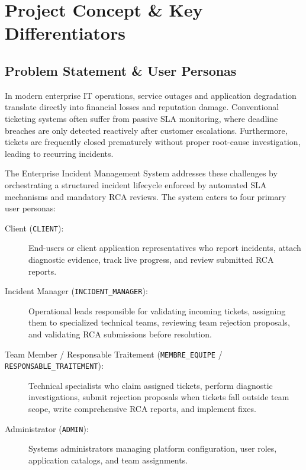 \documentclass[12pt,a4paper]{report}
\begin{document}
\chapter{Project Concept \& Key Differentiators}

\section{Problem Statement \& User Personas}
In modern enterprise IT operations, service outages and application degradation translate directly into financial losses and reputation damage. Conventional ticketing systems often suffer from passive SLA monitoring, where deadline breaches are only detected reactively after customer escalations. Furthermore, tickets are frequently closed prematurely without proper root-cause investigation, leading to recurring incidents.

The Enterprise Incident Management System addresses these challenges by orchestrating a structured incident lifecycle enforced by automated SLA mechanisms and mandatory RCA reviews. The system caters to four primary user personas:
\begin{description}
    \item[Client (\texttt{CLIENT}):] End-users or client application representatives who report incidents, attach diagnostic evidence, track live progress, and review submitted RCA reports.
    \item[Incident Manager (\texttt{INCIDENT\_MANAGER}):] Operational leads responsible for validating incoming tickets, assigning them to specialized technical teams, reviewing team rejection proposals, and validating RCA submissions before resolution.
    \item[Team Member / Responsable Traitement (\texttt{MEMBRE\_EQUIPE} / \texttt{RESPONSABLE\_TRAITEMENT}):] Technical specialists who claim assigned tickets, perform diagnostic investigations, submit rejection proposals when tickets fall outside team scope, write comprehensive RCA reports, and implement fixes.
    \item[Administrator (\texttt{ADMIN}):] Systems administrators managing platform configuration, user roles, application catalogs, and team assignments.
\end{description}
\end{document}
